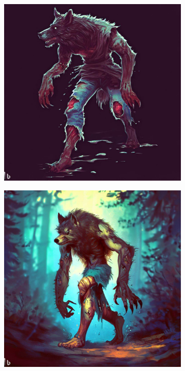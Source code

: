 \documentclass[11pt, twoside]{article}
\begin{document}
\begin{figure}[H]
\centering
\caption{Werwolf}
\label{fig:wolf}
  \begin{subfigure}{0.3\textwidth}
    \centering
    \includegraphics[width=0.99\linewidth]{wolf1.jpeg}
  \end{subfigure}%
  \begin{subfigure}{0.3\textwidth}
    \centering
    \includegraphics[width=0.99\linewidth]{wolf2.jpeg}

\end{subfigure}
\end{figure}
\end{document}
